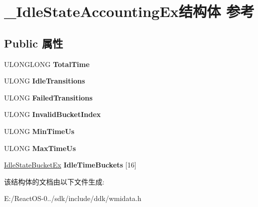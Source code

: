 \hypertarget{struct___idle_state_accounting_ex}{}\section{\+\_\+\+Idle\+State\+Accounting\+Ex结构体 参考}
\label{struct___idle_state_accounting_ex}
\subsection*{Public 属性}
\begin{DoxyCompactItemize}
\item 
\mbox{\label{struct___idle_state_accounting_ex_adfa583d3f5afd8961ea9a775ef5ce120}} 
U\+L\+O\+N\+G\+L\+O\+NG {\bfseries Total\+Time}
\item 
\mbox{\label{struct___idle_state_accounting_ex_a29bf044513456ea13eecfbff9448fe3d}} 
U\+L\+O\+NG {\bfseries Idle\+Transitions}
\item 
\mbox{\label{struct___idle_state_accounting_ex_a4c12edcd5d875ae0df4d299b57433341}} 
U\+L\+O\+NG {\bfseries Failed\+Transitions}
\item 
\mbox{\label{struct___idle_state_accounting_ex_a404cfbe7a39e761072c385845ad18d02}} 
U\+L\+O\+NG {\bfseries Invalid\+Bucket\+Index}
\item 
\mbox{\label{struct___idle_state_accounting_ex_a5d0c4f8f55cc8bc94c8863fa13622b51}} 
U\+L\+O\+NG {\bfseries Min\+Time\+Us}
\item 
\mbox{\label{struct___idle_state_accounting_ex_a4a3b85d3ba11daf811d0af641af31c6f}} 
U\+L\+O\+NG {\bfseries Max\+Time\+Us}
\item 
\mbox{\label{struct___idle_state_accounting_ex_a9c71a0db89536507148bbd77b6eb7f60}} 
\hyperlink{struct___idle_state_bucket_ex}{Idle\+State\+Bucket\+Ex} {\bfseries Idle\+Time\+Buckets} \mbox{[}16\mbox{]}
\end{DoxyCompactItemize}


该结构体的文档由以下文件生成\+:\begin{DoxyCompactItemize}
\item 
E\+:/\+React\+O\+S-\/0../sdk/include/ddk/wmidata.\+h\end{DoxyCompactItemize}
